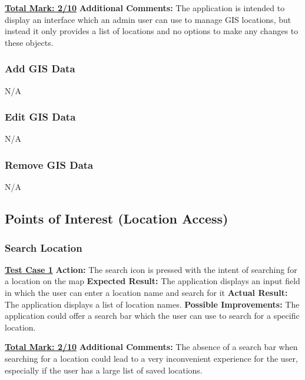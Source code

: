 \documentclass[english]{article}
\begin{document}
\textbf{\underline{Total Mark: 2/10}}\newline
\textbf{Additional Comments:} The application is intended to display an interface which an admin user can use to manage GIS locations, but instead it only provides a list of locations and no options to make any changes to these objects. \newline

\subsubsection{Add GIS Data}
N/A

\subsubsection{Edit GIS Data}
N/A

\subsubsection{Remove GIS Data}
N/A

\subsection{Points of Interest (Location Access)}

\subsubsection{Search Location}
\textbf{\underline{Test Case 1}}\newline
\textbf{Action:} The search icon is pressed with the intent of searching for a location on the map\newline
\textbf{Expected Result:} The application displays an input field in which the user can enter a location name and search for it\newline
\textbf{Actual Result:} The application displays a list of location names.\newline
\textbf{Possible Improvements:} The application could offer a search bar which the user can use to search for a specific location.\newline

\textbf{\underline{Total Mark: 2/10}}\newline
\textbf{Additional Comments:} The absence of a search bar when searching for a location could lead to a very inconvenient experience for the user, especially if the user has a large list of saved locations.\newline
\end{document}
